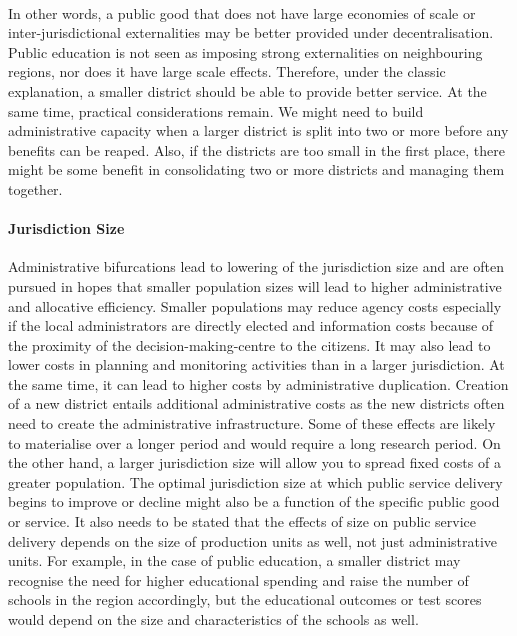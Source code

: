 \documentclass[12pt, a4paper]{article}
\begin{document}
\paragraph{} In other words, a public good that does not have large economies of scale or inter-jurisdictional externalities may be better provided under decentralisation. Public education is not seen as imposing strong externalities on neighbouring regions, nor does it have large scale effects. Therefore, under the classic explanation, a smaller district should be able to provide better service. At the same time, practical considerations remain. We might need to build administrative capacity when a larger district is split into two or more before any benefits can be reaped. Also, if the districts are too small in the first place, there might be some benefit in consolidating two or more districts and managing them together.  
	
\paragraph{Jurisdiction Size} Administrative bifurcations lead to lowering of the jurisdiction size and are often pursued in hopes that smaller population sizes will lead to higher administrative and allocative efficiency. Smaller populations may reduce agency costs especially if the local administrators are directly elected and information costs because of the proximity of the decision-making-centre to the citizens. It may also lead to lower costs in planning and monitoring activities than in a larger jurisdiction. At the same time, it can lead to higher costs by administrative duplication. Creation of a new district entails additional administrative costs as the new districts often need to create the administrative infrastructure. Some of these effects are likely to materialise over a longer period and would require a long research period. On the other hand, a larger jurisdiction size will allow you to spread fixed costs of a greater population. \nocite{allers2016effects} \nocite{lassen_jurisdiction_2011} The optimal jurisdiction size at which public service delivery begins to improve or decline might also be a function of the specific public good or service. It also needs to be stated that the effects of size on public service delivery depends on the size of production units as well, not just administrative units. For example, in the case of public education, a smaller district may recognise the need for higher educational spending and raise the number of schools in the region accordingly, but the educational outcomes or test scores would depend on the size and characteristics of the schools as well. 
	
\end{document}
